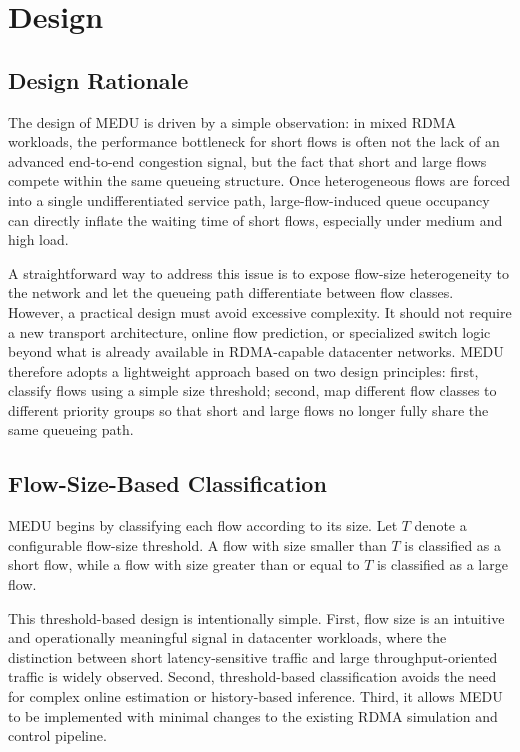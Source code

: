 \documentclass[conference]{IEEEtran}
\begin{document}
\section{Design}

\subsection{Design Rationale}

The design of MEDU is driven by a simple observation: in mixed RDMA workloads, the performance bottleneck for short flows is often not the lack of an advanced end-to-end congestion signal, but the fact that short and large flows compete within the same queueing structure. Once heterogeneous flows are forced into a single undifferentiated service path, large-flow-induced queue occupancy can directly inflate the waiting time of short flows, especially under medium and high load.

A straightforward way to address this issue is to expose flow-size heterogeneity to the network and let the queueing path differentiate between flow classes. However, a practical design must avoid excessive complexity. It should not require a new transport architecture, online flow prediction, or specialized switch logic beyond what is already available in RDMA-capable datacenter networks. MEDU therefore adopts a lightweight approach based on two design principles: first, classify flows using a simple size threshold; second, map different flow classes to different priority groups so that short and large flows no longer fully share the same queueing path.

\subsection{Flow-Size-Based Classification}

MEDU begins by classifying each flow according to its size. Let $T$ denote a configurable flow-size threshold. A flow with size smaller than $T$ is classified as a short flow, while a flow with size greater than or equal to $T$ is classified as a large flow.

This threshold-based design is intentionally simple. First, flow size is an intuitive and operationally meaningful signal in datacenter workloads, where the distinction between short latency-sensitive traffic and large throughput-oriented traffic is widely observed. Second, threshold-based classification avoids the need for complex online estimation or history-based inference. Third, it allows MEDU to be implemented with minimal changes to the existing RDMA simulation and control pipeline.
\end{document}
